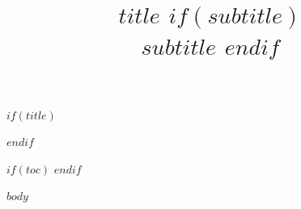 \documentclass[12pt,a4paper,oneside]{report}
\title{\vspace{1.5in}\Huge\textbf{\uppercase{$title$}} $if(subtitle)$ \\[1.5em] \Large $subtitle$ $endif$}
\author{}
\date{}
\begin{document}
$if(title)$
\maketitle
\thispagestyle{empty}
\newpage
$endif$

$if(toc)$
\tableofcontents
\newpage
$endif$

$body$
\end{document}
